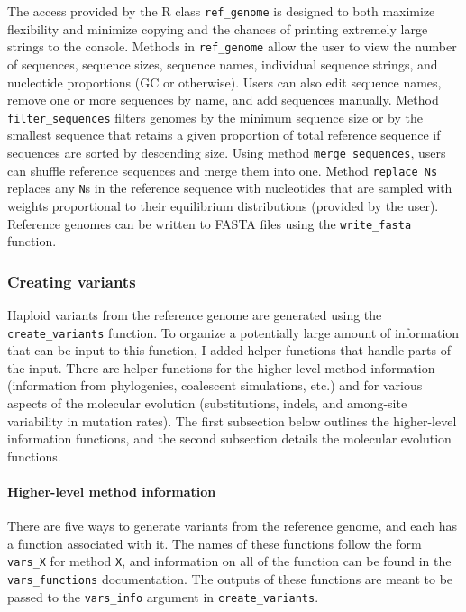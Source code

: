 \documentclass[12pt,]{article}
\let\oldparagraph\paragraph
\renewcommand{\paragraph}[1]{\oldparagraph{#1}\mbox{}}
\begin{document}
The access provided by the R class \texttt{ref\_genome} is designed to both
maximize flexibility and minimize copying and the chances of
printing extremely large strings to the console.
Methods in \texttt{ref\_genome} allow the user to view the
number of sequences, sequence sizes, sequence names, individual sequence strings,
and nucleotide proportions (GC or otherwise).
Users can also edit sequence names, remove one or more sequences by name,
and add sequences manually.
Method \texttt{filter\_sequences} filters genomes by the minimum sequence size or
by the smallest sequence that retains a given proportion of total reference
sequence if sequences are sorted by descending size.
Using method \texttt{merge\_sequences}, users can shuffle reference sequences and
merge them into one.
Method \texttt{replace\_Ns} replaces any \texttt{N}s in the reference sequence with nucleotides
that are sampled with weights proportional to their equilibrium distributions
(provided by the user).
Reference genomes can be written to FASTA files using the \texttt{write\_fasta} function.

\hypertarget{creating-variants}{%
\subsubsection{Creating variants}\label{creating-variants}}

Haploid variants from the reference genome are generated using the
\texttt{create\_variants} function.
To organize a potentially large amount of information that can be input to this function,
I added helper functions that handle parts of the input.
There are helper functions for the higher-level method information
(information from phylogenies, coalescent simulations, etc.) and
for various aspects of the molecular evolution (substitutions, indels, and among-site
variability in mutation rates).
The first subsection below outlines the higher-level information functions, and
the second subsection details the molecular evolution functions.

\hypertarget{higher-level-method-information}{%
\paragraph{Higher-level method information}\label{higher-level-method-information}}

There are five ways to generate variants from the reference genome, and
each has a function associated with it.
The names of these functions follow the form \texttt{vars\_X} for method \texttt{X},
and information on all of the function can be found in the \texttt{vars\_functions} documentation.
The outputs of these functions are meant to be passed to the \texttt{vars\_info} argument
in \texttt{create\_variants}.
\end{document}
